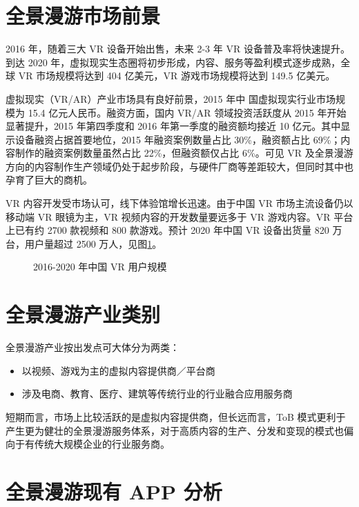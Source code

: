 \section{全景漫游市场前景}

2016 年，随着三大 VR 设备开始出售，未来 2-3 年 VR 设备普及率将快速提升。到达 2020 年，虚拟现实生态圈将初步形成，内容、服务等盈利模式逐步成熟，全球 VR 市场规模将达到 404 亿美元，VR 游戏市场规模将达到 149.5 亿美元。

虚拟现实（VR/AR）产业市场具有良好前景，2015 年中 国虚拟现实行业市场规模为 15.4 亿元人民币。融资方面，国内 VR/AR 领域投资活跃度从 2015 年开始显著提升，2015 年第四季度和 2016 年第一季度的融资额均接近 10 亿元。其中显示设备融资占据首要地位，2015 年融资案例数量占比 30\%，融资额占比 69\%；内容制作的融资案例数量虽然占比 22\%，但融资额仅占比 6\%。可见 VR 及全景漫游方向的内容制作生产领域仍处于起步阶段，与硬件厂商等差距较大，但同时其中也孕育了巨大的商机。

VR 内容开发受市场认可，线下体验馆增长迅速。由于中国 VR 市场主流设备仍以移动端 VR 眼镜为主，VR 视频内容的开发数量要远多于 VR 游戏内容。VR 平台上已有约 2700 款视频和 800 款游戏。预计 2020 年中国 VR 设备出货量 820 万台，用户量超过 2500 万人，见图\ref{fig:market}。

\begin{figure}[htp]
\centering
{}
\caption{2016-2020 年中国 VR 用户规模}
\label{fig:market}
\end{figure}

\section{全景漫游产业类别}
全景漫游产业按出发点可大体分为两类：
\begin{itemize}
	\item 以视频、游戏为主的虚拟内容提供商／平台商
	\item 涉及电商、教育、医疗、建筑等传统行业的行业融合应用服务商
\end{itemize}

短期而言，市场上比较活跃的是虚拟内容提供商，但长远而言，ToB 模式更利于产生更为健壮的全景漫游服务体系，对于高质内容的生产、分发和变现的模式也偏向于有传统大规模企业的行业服务商。

\section{全景漫游现有 APP 分析}


